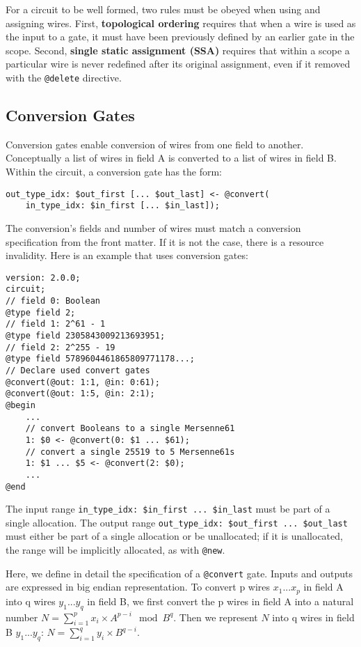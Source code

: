 For a circuit to be well formed, two rules must be obeyed when using and assigning wires.
First, \textbf{topological ordering} requires that when a wire is used as the input to a gate, it must have been previously defined by an earlier gate in the scope.
Second, \textbf{single static assignment (SSA)} requires that within a scope a particular wire is never redefined after its original assignment, even if it removed with the \texttt{@delete} directive.\\

\subsection{Conversion Gates}
\label{subsec:conversiongates}
Conversion gates enable conversion of wires from one field to another.
Conceptually a list of wires in field A is converted to a list of wires in field B.
Within the circuit, a conversion gate has the form:
%
\begin{lstlisting}[language=ir]
out_type_idx: $out_first [... $out_last] <- @convert(
    in_type_idx: $in_first [... $in_last]);
\end{lstlisting}
%
The conversion's fields and number of wires must match a conversion specification from the front matter. If it is not the case, there is a resource invalidity.
Here is an example that uses conversion gates:
\begin{lstlisting}[language=ir]
version: 2.0.0;
circuit;
// field 0: Boolean
@type field 2;
// field 1: 2^61 - 1
@type field 2305843009213693951;
// field 2: 2^255 - 19
@type field 5789604461865809771178...;
// Declare used convert gates
@convert(@out: 1:1, @in: 0:61);
@convert(@out: 1:5, @in: 2:1);
@begin
    ...
    // convert Booleans to a single Mersenne61
    1: $0 <- @convert(0: $1 ... $61);
    // convert a single 25519 to 5 Mersenne61s
    1: $1 ... $5 <- @convert(2: $0);
    ...
@end
\end{lstlisting}
%
The input range \texttt{in\_type\_idx: \$in\_first ... \$in\_last} must be part
of a single allocation.
The output range \texttt{out\_type\_idx: \$out\_first ... \$out\_last} must
either be part of a single allocation or be unallocated; if it is unallocated,
the range will be implicitly allocated, as with \texttt{@new}.

Here, we define in detail the specification of a \texttt{@convert} gate.
Inputs and outputs are expressed in big endian representation.
To convert p wires $x_1 ... x_p$ in field A into q wires $y_1 ... y_q$ in field B, we first convert the p wires in field A into a natural number $N = \sum_{i=1}^p x_i \times A^{p-i} \mod B^q$.
Then we represent $N$ into q wires in field B $y_1 ... y_q$: $N = \sum_{i=1}^q y_i \times B^{q-i}$.
%

